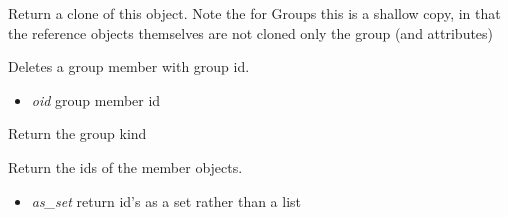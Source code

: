 \documentclass[a4paper,11pt,english]{sphinxmanual}
\begin{document}
\begin{fulllineitems}
\begin{fulllineitems}
\begin{itemize}
\end{itemize}

\end{fulllineitems}


\begin{fulllineitems}
\label{modules_doc:cbmpy.CBModel.Group.clone}
Return a clone of this object. Note the for Groups this is a shallow copy, in that the reference
objects themselves are not cloned only the group (and attributes)

\end{fulllineitems}


\begin{fulllineitems}
\label{modules_doc:cbmpy.CBModel.Group.deleteMember}
Deletes a group member with group id.
\begin{itemize}
\item {} 
\emph{oid} group member id

\end{itemize}

\end{fulllineitems}


\begin{fulllineitems}
\label{modules_doc:cbmpy.CBModel.Group.getKind}
Return the group kind

\end{fulllineitems}


\begin{fulllineitems}
\label{modules_doc:cbmpy.CBModel.Group.getMemberIDs}
Return the ids of the member objects.
\begin{itemize}
\item {} 
\emph{as\_set} return id's as a set rather than a list

\end{itemize}

\end{fulllineitems}


\end{fulllineitems}
\end{document}
